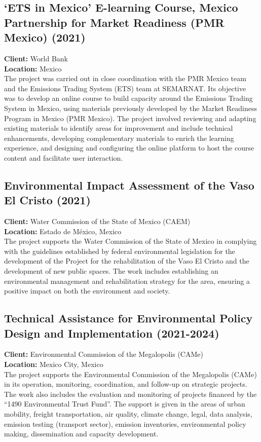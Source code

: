 \documentclass[
	a4paper,
	12pt,
	unnumberedsections,
]{CSSullivanBusinessReport}
\begin{document}
\subsection{‘ETS in Mexico’ E-learning Course, Mexico Partnership for Market Readiness (PMR Mexico) (2021)}
\textbf{Client:}  World Bank \\
\textbf{Location:}  Mexico \\[0.5em]
 The project was carried out in close coordination with the PMR Mexico team and the Emissions Trading System (ETS) team at SEMARNAT. Its objective was to develop an online course to build capacity around the Emissions Trading System in Mexico, using materials previously developed by the Market Readiness Program in Mexico (PMR Mexico). The project involved reviewing and adapting existing materials to identify areas for improvement and include technical enhancements, developing complementary materials to enrich the learning experience, and designing and configuring the online platform to host the course content and facilitate user interaction.

\subsection{Environmental Impact Assessment of the Vaso El Cristo (2021)}
\textbf{Client:}  Water Commission of the State of Mexico (CAEM) \\
\textbf{Location:}  Estado de México, Mexico \\[0.5em]
 The project supports the Water Commission of the State of Mexico in complying with the guidelines established by federal environmental legislation for the development of the Project for the rehabilitation of the Vaso El Cristo and the development of new public spaces. The work includes establishing an environmental management and rehabilitation strategy for the area, ensuring a positive impact on both the environment and society.

\subsection{Technical Assistance for Environmental Policy Design and Implementation (2021-2024)}
\textbf{Client:}  Environmental Commission of the Megalopolis (CAMe)  \\
\textbf{Location:}  Mexico City, Mexico \\[0.5em]
 The project supports the Environmental Commission of the Megalopolis (CAMe) in its operation, monitoring, coordination, and follow-up on strategic projects. The work also includes the evaluation and monitoring of projects financed by the “1490 Environmental Trust Fund”. The support is given in the areas of urban mobility, freight transportation, air quality, climate change, legal, data analysis, emission testing (transport sector), emission inventories, environmental policy making, dissemination and capacity development.
\end{document}
